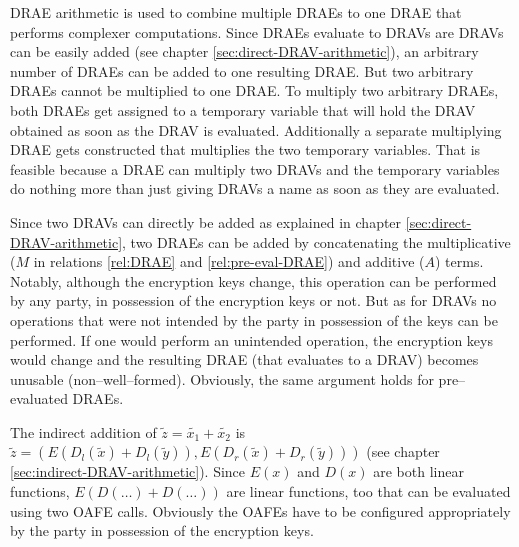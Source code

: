 
DRAE arithmetic is used to combine multiple DRAEs to one DRAE that performs
complexer computations. Since DRAEs evaluate to DRAVs are DRAVs can be easily
added (see chapter \ref{sec:direct-DRAV-arithmetic}), an arbitrary number of
DRAEs can be added to one resulting DRAE. But two arbitrary DRAEs cannot be
multiplied to one DRAE. To multiply two arbitrary DRAEs, both DRAEs get assigned
to a temporary variable that will hold the DRAV obtained as soon as the DRAV is
evaluated. Additionally a separate multiplying DRAE gets constructed that
multiplies the two temporary variables. That is feasible because a DRAE can
multiply two DRAVs and the temporary variables do nothing more than just giving
DRAVs a name as soon as they are evaluated.


Since two DRAVs can directly be added as explained in chapter
\ref{sec:direct-DRAV-arithmetic}, two DRAEs can be added by concatenating the
multiplicative ($M$ in relations \ref{rel:DRAE} and \ref{rel:pre-eval-DRAE}) and
additive ($A$) terms. Notably, although the encryption keys change, this
operation can be performed by any party, in possession of the encryption keys or
not. But as for DRAVs no operations that were not intended by the party in
possession of the keys can be performed. If one would perform an unintended
operation, the encryption keys would change and the resulting DRAE (that
evaluates to a DRAV) becomes unusable (non--well--formed). Obviously, the same
argument holds for pre--evaluated DRAEs.



The indirect addition of $\widetilde{z} = \widetilde{x_1} + \widetilde{x_2}$ is
$\widetilde{z} =
\left( E\left(D_l(\widetilde{x}) + D_l(\widetilde{y})\right),
       E\left(D_r(\widetilde{x}) + D_r(\widetilde{y})\right)
\right)$
(see chapter \ref{sec:indirect-DRAV-arithmetic}).
Since $E(x)$ and $D(x)$ are both linear functions, $E\left(D(\ldots)
+D(\ldots)\right)$ are linear functions, too that can be evaluated using two
OAFE calls.  Obviously the OAFEs have to be configured appropriately by the
party in possession of the encryption keys.



\label{sec:DRAE-multiplication}

